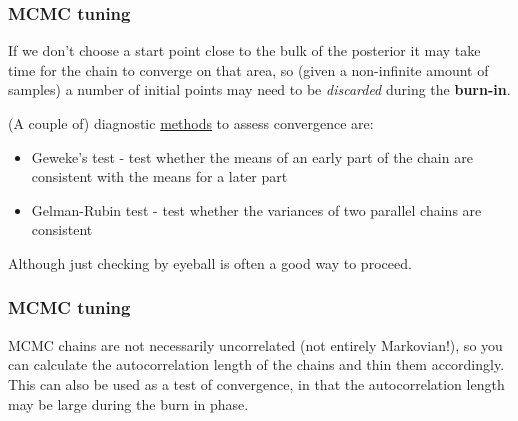 \begin{frame}

\frametitle{MCMC tuning}
\label{mcmctuning}

If we don't choose a start point close to the bulk of the posterior it may take time
for the chain to converge on that area, so (given a non-infinite amount of samples)
a number of initial points may need to be \emph{discarded} during the \textbf{burn-in}.

(A couple of) diagnostic \href{http://support.sas.com/documentation/cdl/en/statug/63347/HTML/default/viewer.htm\#statug\_introbayes\_sect008.htm}{methods} to assess convergence are:

\begin{itemize}
\item Geweke's test - test whether the means of an early part of the chain are consistent with the means for a later part

\item Gelman-Rubin test - test whether the variances of two parallel chains are consistent

\end{itemize}

Although just checking by eyeball is often a good way to proceed.

\end{frame}

\begin{frame}

\frametitle{MCMC tuning}
\label{mcmctuning}

MCMC chains are not necessarily uncorrelated (not entirely Markovian!), so you can
calculate the autocorrelation length of the chains and thin them accordingly. This
can also be used as a test of convergence, in that the autocorrelation length may be large
during the burn in phase.

\end{frame}

